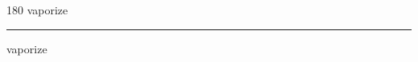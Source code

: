 
\begin{frame}
\begin{center}
\begin{turn}{180}
{\fontsize{2.5cm}{1em}\selectfont vaporize}
\end{turn}
\vspace{1em}\par  
\hrule
\vspace{1em}\par  
{\fontsize{2.5cm}{1em}\selectfont vaporize}
\end{center}
\end{frame}
